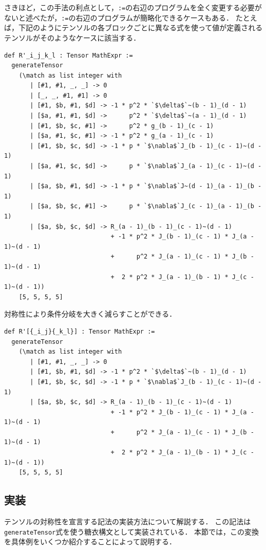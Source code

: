 さきほど，この手法の利点として，\lstinline{:=}の右辺のプログラムを全く変更する必要がないと述べたが，\lstinline{:=}の右辺のプログラムが簡略化できるケースもある．
たとえば，下記のようにテンソルの各ブロックごとに異なる式を使って値が定義されるテンソルがそのようなケースに該当する．
\begin{lstlisting}[language=egison,numbers=none]
def R'_i_j_k_l : Tensor MathExpr :=
  generateTensor
    (\match as list integer with
       | [#1, #1, _, _] -> 0
       | [_, _, #1, #1] -> 0
       | [#1, $b, #1, $d] -> -1 * p^2 * `$\delta$`~(b - 1)_(d - 1)
       | [$a, #1, #1, $d] ->      p^2 * `$\delta$`~(a - 1)_(d - 1)
       | [#1, $b, $c, #1] ->      p^2 * g_(b - 1)_(c - 1)
       | [$a, #1, $c, #1] -> -1 * p^2 * g_(a - 1)_(c - 1)
       | [#1, $b, $c, $d] -> -1 * p * `$\nabla$`J_(b - 1)_(c - 1)~(d - 1)
       | [$a, #1, $c, $d] ->      p * `$\nabla$`J_(a - 1)_(c - 1)~(d - 1)
       | [$a, $b, #1, $d] -> -1 * p * `$\nabla$`J~(d - 1)_(a - 1)_(b - 1)
       | [$a, $b, $c, #1] ->      p * `$\nabla$`J_(c - 1)_(a - 1)_(b - 1)
       | [$a, $b, $c, $d] -> R_(a - 1)_(b - 1)_(c - 1)~(d - 1)
                             + -1 * p^2 * J_(b - 1)_(c - 1) * J_(a - 1)~(d - 1)
                             +      p^2 * J_(a - 1)_(c - 1) * J_(b - 1)~(d - 1)
                             +  2 * p^2 * J_(a - 1)_(b - 1) * J_(c - 1)~(d - 1))
    [5, 5, 5, 5]
\end{lstlisting}
対称性により条件分岐を大きく減らすことができる．
\begin{lstlisting}[language=egison,numbers=none]
def R'[{_i_j}{_k_l}] : Tensor MathExpr :=
  generateTensor
    (\match as list integer with
       | [#1, #1, _, _] -> 0
       | [#1, $b, #1, $d] -> -1 * p^2 * `$\delta$`~(b - 1)_(d - 1)
       | [#1, $b, $c, $d] -> -1 * p * `$\nabla$`J_(b - 1)_(c - 1)~(d - 1)
       | [$a, $b, $c, $d] -> R_(a - 1)_(b - 1)_(c - 1)~(d - 1)
                             + -1 * p^2 * J_(b - 1)_(c - 1) * J_(a - 1)~(d - 1)
                             +      p^2 * J_(a - 1)_(c - 1) * J_(b - 1)~(d - 1)
                             +  2 * p^2 * J_(a - 1)_(b - 1) * J_(c - 1)~(d - 1))
    [5, 5, 5, 5]
\end{lstlisting}


\subsection{実装}

テンソルの対称性を宣言する記法の実装方法について解説する．
この記法は\lstinline{generateTensor}式を使う糖衣構文として実装されている．
本節では，この変換を具体例をいくつか紹介することによって説明する．

